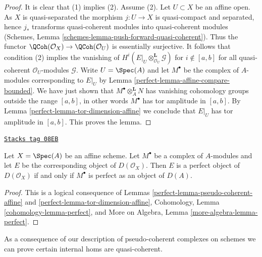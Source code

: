 \begin{proof}

It is clear that (1) implies (2). Assume (2). Let $U \subset X$ be
an affine open. As $X$ is quasi-separated the morphism $j : U \to X$
is quasi-compact and separated, hence $j_*$ transforms quasi-coherent
modules into quasi-coherent modules
(Schemes, Lemma \ref{schemes-lemma-push-forward-quasi-coherent}).
Thus the functor
$\QCoh(\mathcal{O}_X) \to \QCoh(\mathcal{O}_U)$
is essentially surjective. It follows that condition (2)
implies the vanishing of
$H^i(E|_U \otimes_{\mathcal{O}_U}^\mathbf{L} \mathcal{G})$
for $i \not \in [a, b]$ for all quasi-coherent $\mathcal{O}_U$-modules
$\mathcal{G}$. Write $U = \Spec(A)$ and let $M^\bullet$ be the
complex of $A$-modules corresponding to $E|_U$ by
Lemma \ref{perfect-lemma-affine-compare-bounded}.
We have just shown that $M^\bullet \otimes_A^\mathbf{L} N$
has vanishing cohomology groups outside the range $[a, b]$,
in other words $M^\bullet$ has tor amplitude in $[a, b]$.
By Lemma \ref{perfect-lemma-tor-dimension-affine}
we conclude that $E|_U$ has tor amplitude in $[a, b]$.
This proves the lemma.
\end{proof}

\begin{lemma}
\label{perfect-lemma-perfect-affine}
\href{https://stacks.math.columbia.edu/tag/08EB}{\texttt{Stacks tag 08EB}}

Let $X = \Spec(A)$ be an affine scheme. Let $M^\bullet$ be a
complex of $A$-modules and let $E$ be the corresponding object
of $D(\mathcal{O}_X)$. Then $E$ is a perfect object of $D(\mathcal{O}_X)$
if and only if $M^\bullet$ is perfect as an object of $D(A)$.
\end{lemma}

\begin{proof}

This is a logical consequence of
Lemmas \ref{perfect-lemma-pseudo-coherent-affine} and
\ref{perfect-lemma-tor-dimension-affine},
Cohomology, Lemma \ref{cohomology-lemma-perfect}, and
More on Algebra, Lemma \ref{more-algebra-lemma-perfect}.
\end{proof}

As a consequence of our description of pseudo-coherent
complexes on schemes we can prove certain internal homs
are quasi-coherent.

